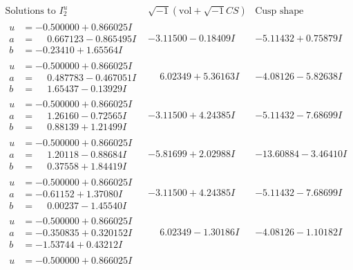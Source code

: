 \documentclass[1p]{elsarticle_modified}
\theoremstyle{definition}
\newcommand{\I}{\sqrt{-1}}
\begin{document}
$$\begin{array}{c|c|c}  
\text{Solutions to }I^u_{2}& \I (\text{vol} + \sqrt{-1}CS) & \text{Cusp shape}\\
 \hline 
\begin{aligned}
u &= -0.500000 + 0.866025 I \\
a &= \phantom{-}0.667123 - 0.865495 I \\
b &= -0.23410 + 1.65564 I\end{aligned}
 & -3.11500 - 0.18409 I & -5.11432 + 0.75879 I \\ \hline\begin{aligned}
u &= -0.500000 + 0.866025 I \\
a &= \phantom{-}0.487783 - 0.467051 I \\
b &= \phantom{-}1.65437 - 0.13929 I\end{aligned}
 & \phantom{-}6.02349 + 5.36163 I & -4.08126 - 5.82638 I \\ \hline\begin{aligned}
u &= -0.500000 + 0.866025 I \\
a &= \phantom{-}1.26160 - 0.72565 I \\
b &= \phantom{-}0.88139 + 1.21499 I\end{aligned}
 & -3.11500 + 4.24385 I & -5.11432 - 7.68699 I \\ \hline\begin{aligned}
u &= -0.500000 + 0.866025 I \\
a &= \phantom{-}1.20118 - 0.88684 I \\
b &= \phantom{-}0.37558 + 1.84419 I\end{aligned}
 & -5.81699 + 2.02988 I & -13.60884 - 3.46410 I \\ \hline\begin{aligned}
u &= -0.500000 + 0.866025 I \\
a &= -0.61152 + 1.37080 I \\
b &= \phantom{-}0.00237 - 1.45540 I\end{aligned}
 & -3.11500 + 4.24385 I & -5.11432 - 7.68699 I \\ \hline\begin{aligned}
u &= -0.500000 + 0.866025 I \\
a &= -0.350835 + 0.320152 I \\
b &= -1.53744 + 0.43212 I\end{aligned}
 & \phantom{-}6.02349 - 1.30186 I & -4.08126 - 1.10182 I \\ \hline\begin{aligned}
u &= -0.500000 + 0.866025 I \\

\end{aligned}
\end{array}$$
\end{document}
